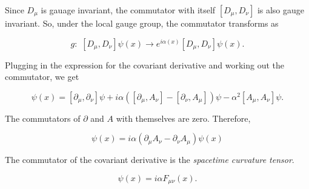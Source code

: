 \noindent Since $D_\mu$ is gauage invariant, the commutator with itself $[D_\mu, D_\nu ]$ is also gauge invariant. So, under the local gauge group, the commutator transforms as

\begin{equation}
g: \,\, [D_\mu, D_\nu] \psi (x) \rightarrow e^{i \alpha (x)} [D_\mu, D_\nu] \psi (x).
\end{equation}

\noindent Plugging in the expression for the covariant derivative and working out the commutator, we get

\begin{equation}
[D_\mu, D_\nu] \psi (x) = [\partial_\mu, \partial_\nu] \psi + i \alpha ( [\partial_\mu, A_\nu] - [\partial_\nu, A_\mu]) \psi - \alpha^2 [A_\mu, A_\nu] \psi.
\end{equation}

\noindent The commutators of $\partial$ and $A$ with themselves are zero. Therefore,

\begin{equation}
[D_\mu, D_\nu] \psi (x) = i \alpha ( \partial_\mu A_\nu - \partial_\nu A_\mu) \psi (x)
\end{equation}

\noindent The commutator of the covariant derivative is the \textit{spacetime curvature tensor}.

\begin{equation}
[D_\mu, D_\nu] \psi (x) =i \alpha F_{\mu\nu} (x).
\end{equation}